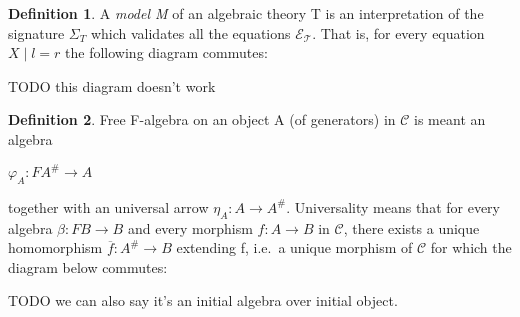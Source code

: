 \documentclass[declaration,shortabstract]{iithesis}
\theoremstyle{definition} \newtheorem{definition}{Definition}[chapter]
\theoremstyle{remark} \newtheorem{remark}[definition]{Observation}
\theoremstyle{plain} \newtheorem{theorem}[definition]{Theorem}
\theoremstyle{plain} \newtheorem{lemma}[definition]{Lemma}
\begin{document}
    \begin{definition}

    A \textit{model M} of an algebraic theory T is an interpretation of the
    signature ${\Sigma_{T}}$ which validates all the equations $\mathcal{E_{T}}$.
    That is, for every equation $X \mid l = r$ the following diagram commutes:

    \begin{center}
    \end{center}

    TODO this diagram doesn't work

    \begin{center}
    \end{center}

    \end{definition}


    \begin{definition}

    Free F-algebra on an object A (of generators) in $\mathcal{C}$ is meant an algebra

    \begin{center}

    $ \varphi_{A} : F A^{\#} \longrightarrow A $

    \end{center}
    together with an universal arrow $ \eta_{A} : A \longrightarrow A^{\#} $.
    Universality means that for every algebra $ \beta : F B \longrightarrow B $
    and every morphism $ f : A \longrightarrow B $ in $ \mathcal{C}$, there
    exists a unique homomorphism $ \overline{f} : A^{\#} \longrightarrow B $
    extending f, i.e.\ a unique morphism of $ \mathcal{C}$ for which the diagram
    below commutes:

    TODO we can also say it's an initial algebra over initial object.

    \begin{center}
    \begin{tikzcd}[row sep=huge, column sep=large]
    \end{tikzcd}
    \end{center}

    \end{definition}
\end{document}
